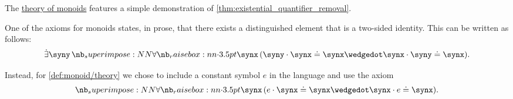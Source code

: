 \begin{example}\label{ex:existential_quantifier_removal_monoids}
  The \hyperref[def:monoid/theory]{theory of monoids} features a simple demonstration of \cref{thm:existential_quantifier_removal}.

  One of the axioms for monoids states, in prose, that there exists a distinguished element that is a two-sided identity. This can be written as follows:
  \begin{equation*}
    \qexists \syny \qforall \synx (\syny \cdot \synx \syneq \synx \synwedge \synx \cdot \syny \syneq \synx).
  \end{equation*}

  Instead, for \cref{def:monoid/theory} we chose to include a constant symbol \( e \) in the language and use the axiom
  \begin{equation*}
    \qforall \synx (e \cdot \synx \syneq \synx \synwedge \synx \cdot e \syneq \synx).
  \end{equation*}
\end{example}

